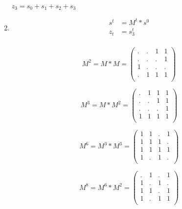 \documentclass[12pt,a4paper,final,onecolumn,oneside]{article}
\begin{document}
\begin{enumerate}[label=(\alph*)]
    $z_3 = s_0 + s_1 + s_2 + s_3$
    
    \item
    \begin{equation*}
        \begin{aligned}
        s^t &= M^t * s^0 \\
        z_t &= s^t_3 \\
        \end{aligned}
    \end{equation*}
    
    \begin{equation*}
    M^2 = M * M =
    \begin{pmatrix}
    . & . & 1 & 1 \\
    . & . & . & 1 \\
    1 & . & . & . \\
    . & 1 & 1 & 1 \\
    \end{pmatrix}
    \end{equation*}
    
    \begin{equation*}
    M^3 = M * M^2 =
    \begin{pmatrix}
    . & 1 & 1 & 1 \\
    . & . & 1 & 1 \\
    . & . & . & 1 \\
    1 & 1 & 1 & 1 \\
    \end{pmatrix}
    \end{equation*}

    \begin{equation*}
    M^6 = M^3 * M^3 =
    \begin{pmatrix}
    1 & 1 & . & 1 \\
    1 & 1 & 1 & . \\
    1 & 1 & 1 & 1 \\
    1 & . & 1 & . \\
    \end{pmatrix}
    \end{equation*}
    
    \begin{equation*}
    M^8 = M^6 * M^2 =
    \begin{pmatrix}
    . & 1 & . & 1 \\
    1 & . & 1 & . \\
    1 & 1 & . & 1 \\
    1 & . & 1 & 1 \\
    \end{pmatrix}
    \end{equation*}
    

\end{enumerate}
\end{document}
